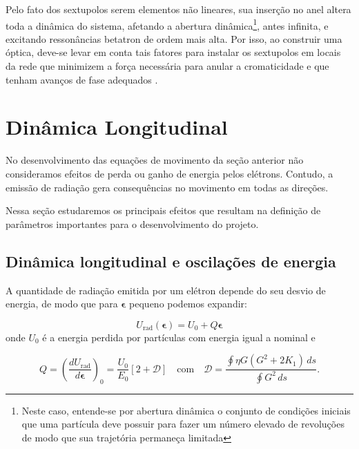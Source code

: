 Pelo fato dos sextupolos serem elementos não lineares, sua inserção no anel altera toda a dinâmica do sistema, afetando a abertura dinâmica\footnote{Neste caso, entende-se por abertura dinâmica o conjunto de condições iniciais que uma partícula deve possuir para fazer um número elevado de revoluções de modo que sua trajetória permaneça limitada}, antes infinita, e excitando ressonâncias betatron de ordem mais alta. Por isso, ao construir uma óptica, deve-se levar em conta tais fatores para instalar os sextupolos em locais da rede que minimizem a força necessária para anular a cromaticidade e que tenham avanços de fase adequados \cite{Huth}.


\section{Dinâmica Longitudinal}

No desenvolvimento das equações de movimento da seção anterior não consideramos efeitos de perda ou ganho de energia pelos elétrons. Contudo, a emissão de radiação gera consequências no movimento em todas as direções. 

Nessa seção estudaremos os principais efeitos que resultam na definição de parâmetros importantes para o desenvolvimento do projeto.

\subsection{Dinâmica longitudinal e oscilações de energia}

A quantidade de radiação emitida por um elétron depende do seu desvio de energia, de modo que para $\boldsymbol{\epsilon}$ pequeno podemos expandir:

\begin{equation}
 U_{\mathrm{rad}}(\boldsymbol{\epsilon}) = U_0 + Q \boldsymbol{\epsilon}
\end{equation}
onde $U_0$ é a energia perdida por partículas com energia igual a nominal e \cite{Sands}

\begin{equation}
 Q=\left(\frac{d U_\mathrm{rad}}{d \boldsymbol{\epsilon}}\right)_0 = 
\frac{U_0}{E_0}\left[2+\mathcal{D}\right]\quad \text{com} \quad\mathcal{D} = 
\frac{\oint \eta G(G^2+2 K_1) \, ds}{\oint G^2\,ds}.
\end{equation}

